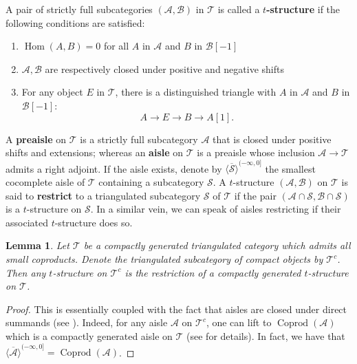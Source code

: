 \documentclass[11pt]{amsart}
\theoremstyle{plain}
\newtheorem{lemma}[theorem]{Lemma}
\theoremstyle{definition}
\numberwithin{equation}{section}
\numberwithin{theorem}{section}
\begin{document}
A pair of strictly full subcategories $(\mathcal{A},\mathcal{B})$ in $\mathcal{T}$ is called a \textbf{$t$-structure} if the following conditions are satisfied:
\begin{enumerate}
    \item $\operatorname{Hom}(A,B)=0$ for all $A$ in $\mathcal{A}$ and $B$ in $\mathcal{B}[-1]$
    \item $\mathcal{A}, \mathcal{B}$ are respectively closed under positive and negative shifts
    \item For any object $E$ in $\mathcal{T}$, there is a distinguished triangle with $A$ in $\mathcal{A}$ and $B$ in $\mathcal{B}[-1]$:
    \begin{displaymath}
        A \to E \to B \to A[1].
    \end{displaymath}
\end{enumerate}
A \textbf{preaisle} on $\mathcal{T}$ is a strictly full subcategory $\mathcal{A}$ that is closed under positive shifts and extensions; whereas an \textbf{aisle} on $\mathcal{T}$ is a preaisle whose inclusion $\mathcal{A} \to \mathcal{T}$ admits a right adjoint. If the aisle exists, denote by $\overline{ \langle \mathcal{S} \rangle}^{(-\infty,0]}$ the smallest cocomplete aisle of $\mathcal{T}$ containing a subcategory $\mathcal{S}$. A $t$-structure $(\mathcal{A},\mathcal{B})$ on $\mathcal{T}$ is said to \textbf{restrict} to a triangulated subcategory $\mathcal{S}$ of $\mathcal{T}$ if the pair $(\mathcal{A}\cap \mathcal{S},\mathcal{B} \cap \mathcal{S})$ is a $t$-structure on $\mathcal{S}$. In a similar vein, we can speak of aisles restricting if their associated $t$-structure does so.

\begin{lemma}\label{lem:lifitng_tensor_structure_from_perfect_categorie_abstract}
    Let $\mathcal{T}$ be a compactly generated triangulated category which admits all small coproducts. Denote the triangulated subcategory of compact objects by $\mathcal{T}^c$. Then any $t$-structure on $\mathcal{T}^c$ is the restriction of a compactly generated $t$-structure on $\mathcal{T}$.
\end{lemma}

\begin{proof}
    This is essentially \cite[Lemma 1.8 \& Proposition 1.9]{Neeman:2021} coupled with the fact that aisles are closed under direct summands (see \cite[Corollary 1.4]{AlonsoTarrio/JeremiasLopez/Salorio/Souto:2003}). Indeed, for any aisle $\mathcal{A}$ on $\mathcal{T}^c$, one can lift to $\operatorname{Coprod}(\mathcal{A})$ which is a compactly generated aisle on $\mathcal{T}$ (see \cite[Theorem 2.6]{Canonaco/Neeman/Stellari:2025} for details). In fact, we have that $\overline{ \langle \mathcal{A} \rangle}^{(-\infty,0]} = \operatorname{Coprod}(\mathcal{A})$.
\end{proof}
\end{document}
